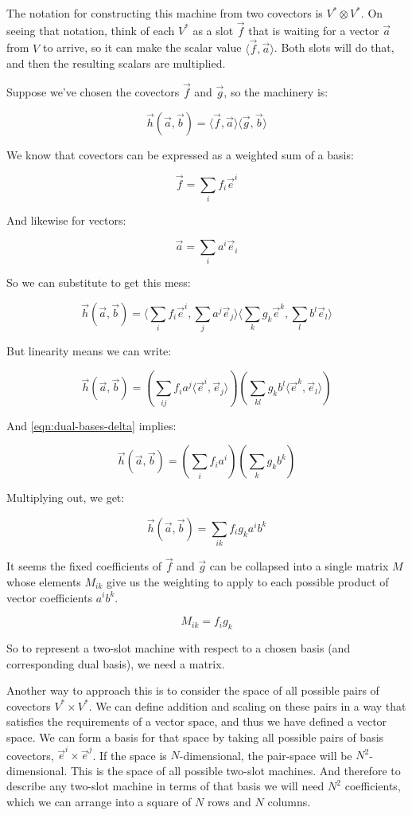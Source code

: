 The notation for constructing this machine from two covectors is $V^* \otimes V^*$. On seeing that notation, think of each $V^*$ as a slot $\vec{f}$ that is waiting for a vector $\vec{a}$ from $V$ to arrive, so it can make the scalar value $\langle \vec{f},\vec{a}\rangle$. Both slots will do that, and then the resulting scalars are multiplied.

Suppose we've chosen the covectors $\vec{f}$ and $\vec{g}$, so the machinery is:

$$
\vec{h}(\vec{a}, \vec{b}) = \langle \vec{f},\vec{a}\rangle \langle \vec{g},\vec{b}\rangle
$$

We know that covectors can be expressed as a weighted sum of a basis:

$$
\vec{f} = \sum_i f_i \vec{e}^i
$$

And likewise for vectors:

$$
\vec{a} = \sum_i a^i \vec{e}_i
$$

So we can substitute to get this mess:

$$
\vec{h}(\vec{a}, \vec{b}) = 
\langle\sum_i f_i \vec{e}^i,\sum_j a^j \vec{e}_j\rangle 
\langle\sum_k g_k \vec{e}^k,\sum_l b^l \vec{e}_l\rangle
$$

But linearity means we can write:

$$
\vec{h}(\vec{a}, \vec{b}) = 
\left(\sum_{ij} f_i a^j \langle\vec{e}^i,\vec{e}_j\rangle \right)
\left(\sum_{kl} g_k b^l \langle\vec{e}^k,\vec{e}_l\rangle \right)
$$

And \eqref{eqn:dual-bases-delta} implies:

$$
\vec{h}(\vec{a}, \vec{b}) = \left(\sum_{i} f_i a^i \right) \left(\sum_{k} g_k b^k \right)
$$

Multiplying out, we get:

$$
\vec{h}(\vec{a}, \vec{b}) = \sum_{ik} f_i g_k a^i b^k
$$

It seems the fixed coefficients of $\vec{f}$ and $\vec{g}$ can be collapsed into a single matrix $M$ whose elements $M_{ik}$ give us the weighting to apply to each possible product of vector coefficients $a^i b^k$.

$$
M_{ik} = f_i g_k
$$

So to represent a two-slot machine with respect to a chosen basis (and corresponding dual basis), we need a matrix.

Another way to approach this is to consider the space of all possible pairs of covectors $V^* \times V^*$. We can define addition and scaling on these pairs in a way that satisfies the requirements of a vector space, and thus we have defined a vector space. We can form a basis for that space by taking all possible pairs of basis covectors, $\vec{e}^i \times \vec{e}^j$. If the space is $N$-dimensional, the pair-space will be $N^2$-dimensional. This is the space of all possible two-slot machines. And therefore to describe any two-slot machine in terms of that basis we will need $N^2$ coefficients, which we can arrange into a square of $N$ rows and $N$ columns.

